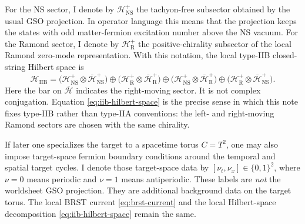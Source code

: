 \documentclass[11pt]{article}
\newcommand{\mc}[1]{\mathcal{#1}}
\begin{document}
For the NS sector, I denote by $\mc H_{\mathrm{NS}}^+$ the tachyon-free subsector obtained by the usual GSO projection. In operator language this means that the projection keeps the states with odd matter-fermion excitation number above the NS vacuum. For the Ramond sector, I denote by $\mc H_{\mathrm{R}}^+$ the positive-chirality subsector of the local Ramond zero-mode representation. With this notation, the local type-IIB closed-string Hilbert space is
\begin{equation}\label{eq:iib-hilbert-space}
\mc H_{\mathrm{IIB}}
=
\bigl(\mc H_{\mathrm{NS}}^+\otimes \bar{\mc H}_{\mathrm{NS}}^+\bigr)
\oplus
\bigl(\mc H_{\mathrm{R}}^+\otimes \bar{\mc H}_{\mathrm{R}}^+\bigr)
\oplus
\bigl(\mc H_{\mathrm{NS}}^+\otimes \bar{\mc H}_{\mathrm{R}}^+\bigr)
\oplus
\bigl(\mc H_{\mathrm{R}}^+\otimes \bar{\mc H}_{\mathrm{NS}}^+\bigr).
\end{equation}
Here the bar on $\bar{\mc H}$ indicates the right-moving sector. It is not complex conjugation. Equation \eqref{eq:iib-hilbert-space} is the precise sense in which this note fixes type-IIB rather than type-IIA conventions: the left- and right-moving Ramond sectors are chosen with the same chirality.

If later one specializes the target to a spacetime torus $C=T^2$, one may also impose target-space fermion boundary conditions around the temporal and spatial target cycles. I denote those target-space data by $[\nu_t,\nu_x]\in\{0,1\}^2$, where $\nu=0$ means periodic and $\nu=1$ means antiperiodic. These labels are \emph{not} the worldsheet GSO projection. They are additional background data on the target torus. The local BRST current \eqref{eq:brst-current} and the local Hilbert-space decomposition \eqref{eq:iib-hilbert-space} remain the same.
\end{document}
